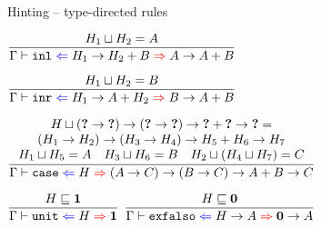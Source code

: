 \documentclass{beamer}
\begin{document}
\begin{frame}{Hinting -- type-directed rules}

\begin{center}
  $\infrule{\sidecond{\hintlub{H_1}{H_2} = A}}{\hinting{\funinl}{\Fun{H_1}{\Sum{H_2}{B}}}{\Fun{A}{\Sum{A}{B}}}}$

  \vspace{2em}

  $\infrule{\sidecond{\hintlub{H_1}{H_2} = B}}{\hinting{\funinr}{\Fun{H_1}{\Sum{A}{H_2}}}{\Fun{B}{\Sum{A}{B}}}}$

  \vspace{2em}

  $\infrule{\begin{array}{c} \sidecond{\hintlub{H}{\Fun{(\Fun{\Hole}{\Hole})}{\Fun{(\Fun{\Hole}{\Hole})}{\Fun{\Sum{\Hole}{\Hole}}{\Hole}}}} = \\ \Fun{(\Fun{H_1}{H_2})}{\Fun{(\Fun{H_3}{H_4})}{\Fun{\Sum{H_5}{H_6}}{H_7}}}} \\ \sidecond{\hintlub{H_1}{H_5} = A} \quad \sidecond{\hintlub{H_3}{H_6} = B} \quad \sidecond{\hintlub{H_2}{(\hintlub{H_4}{H_7})} = C} \end{array}}{\hinting{\funcase}{H}{{\Fun{(\Fun{A}{C})}{\Fun{(\Fun{B}{C})}{\Fun{\Sum{A}{B}}{C}}}}}}$

  \vspace{2em}

  $\infrule{\sidecond{\hintorder{H}{\Unit}}}{\hinting{\unit}{H}{\Unit}}$ \quad
  $\infrule{\sidecond{\hintorder{H}{\Empty}}}{\hinting{\funexfalso}{\Fun{H}{A}}{\Fun{\Empty}{A}}}$
\end{center}

\end{frame}
\end{document}
